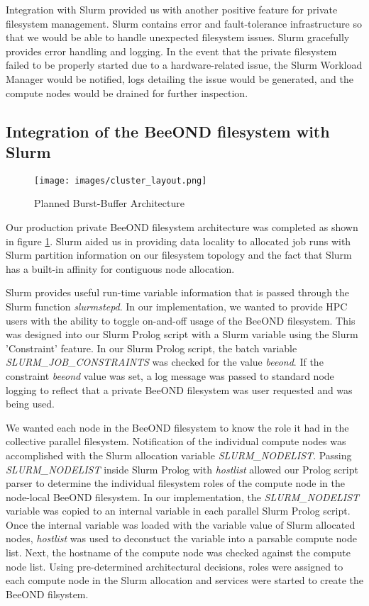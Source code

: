 Integration with Slurm provided us with another positive feature for private filesystem management.  Slurm contains error and fault-tolerance infrastructure so that we would be able to handle unexpected filesystem issues.  Slurm gracefully provides error handling and logging.  In the event that the private filesystem failed to be properly started due to a hardware-related issue, the Slurm Workload Manager would be notified, logs detailing the issue would be generated, and the compute nodes would be drained for further inspection.

\subsection{Integration of the BeeOND filesystem with Slurm}

\begin{figure}[!htb]
  \centerline{\texttt{[image: images/cluster\_layout.png]}}
  \caption{Planned Burst-Buffer Architecture}
  \label{fig:cluster_layout}
\end{figure}

Our production private BeeOND filesystem  architecture was completed as shown in figure \ref{fig:cluster_layout}.  Slurm aided us in providing data locality to allocated job runs with Slurm partition information on our filesystem topology and the fact that Slurm has a built-in affinity for contiguous node allocation. 

Slurm provides useful run-time variable information that is passed through the Slurm function \textit {slurmstepd}.  In our implementation, we wanted to provide HPC users with the ability to toggle on-and-off usage of the BeeOND filesystem.  This was designed into our Slurm Prolog script with a Slurm variable using the Slurm 'Constraint' feature.  In our Slurm Prolog script, the batch variable \textit{SLURM\_JOB\_CONSTRAINTS} was checked for the value \textit{beeond}. If the constraint \textit{beeond} value was set, a log message was passed to standard node logging to reflect that a private BeeOND filesystem was user requested and was being used. 

We wanted each node in the BeeOND filesystem to know the role it had in the collective parallel filesystem.  Notification of the individual compute nodes was accomplished with the Slurm allocation variable \textit {SLURM\_NODELIST}. Passing \textit {SLURM\_NODELIST} inside Slurm Prolog with \textit{hostlist} allowed our Prolog script parser to determine the individual filesystem roles of the compute node in the node-local BeeOND filesystem. In our implementation, the \textit {SLURM\_NODELIST} variable was copied to an internal variable in each parallel Slurm Prolog script.  Once the internal variable was loaded with the variable value of Slurm allocated nodes, \textit {hostlist} was used to deconstuct the variable into a parsable compute node list.  Next, the hostname of the compute node was checked against the compute node list.  Using pre-determined architectural decisions, roles were assigned to each compute node in the Slurm allocation and services were started to create the BeeOND filsystem.

